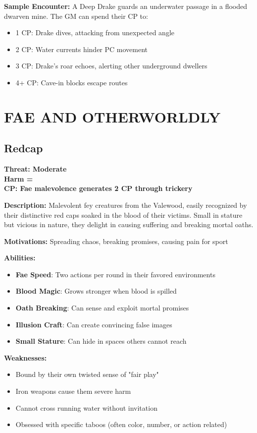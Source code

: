 \documentclass[12pt]{article}
\newcommand{\cp}[1]{\textbf{CP: #1}}
\newcommand{\harm}[1]{\textbf{Harm #1}}
\newcommand{\threat}[1]{\textbf{Threat: #1}}
\begin{document}
\textbf{Sample Encounter:}
A Deep Drake guards an underwater passage in a flooded dwarven mine. The GM can spend their CP to:
\begin{itemize}
\item 1 CP: Drake dives, attacking from unexpected angle
\item 2 CP: Water currents hinder PC movement
\item 3 CP: Drake's roar echoes, alerting other underground dwellers
\item 4+ CP: Cave-in blocks escape routes
\end{itemize}

\section{FAE AND OTHERWORLDLY}

\subsection*{Redcap}

\threat{Moderate} \\
\harm{=} \\
\cp{Fae malevolence generates 2 CP through trickery}

\vspace{0.5em}
\textbf{Description:} Malevolent fey creatures from the Valewood, easily recognized by their distinctive red caps soaked in the blood of their victims. Small in stature but vicious in nature, they delight in causing suffering and breaking mortal oaths.

\textbf{Motivations:} Spreading chaos, breaking promises, causing pain for sport

\textbf{Abilities:}
\begin{itemize}
\item \textbf{Fae Speed}: Two actions per round in their favored environments
\item \textbf{Blood Magic}: Grows stronger when blood is spilled
\item \textbf{Oath Breaking}: Can sense and exploit mortal promises
\item \textbf{Illusion Craft}: Can create convincing false images
\item \textbf{Small Stature}: Can hide in spaces others cannot reach
\end{itemize}

\textbf{Weaknesses:}
\begin{itemize}
\item Bound by their own twisted sense of "fair play"
\item Iron weapons cause them severe harm
\item Cannot cross running water without invitation
\item Obsessed with specific taboos (often color, number, or action related)
\end{itemize}
\end{document}
